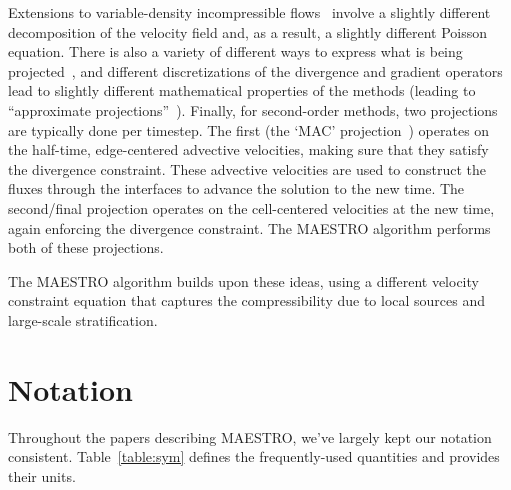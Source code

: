 Extensions to variable-density incompressible
flows~\cite{bellMarcus:1992b} involve a slightly different
decomposition of the velocity field and, as a result, a slightly
different Poisson equation.  There is also a variety of different ways
to express what is being projected~\cite{almgren:bell:crutchfield},
and different discretizations of the divergence and gradient operators
lead to slightly different mathematical properties of the methods
(leading to ``approximate
projections''~\cite{almgrenBellSzymczak:1996}).  Finally, for
second-order methods, two projections are typically done per timestep.
The first (the `MAC' projection~\cite{bellColellaHowell:1991})
operates on the half-time, edge-centered advective velocities, making
sure that they satisfy the divergence constraint.  These advective
velocities are used to construct the fluxes through the interfaces to
advance the solution to the new time.  The second/final projection
operates on the cell-centered velocities at the new time, again
enforcing the divergence constraint.  The MAESTRO algorithm performs
both of these projections.

The MAESTRO algorithm builds upon these ideas, using a different
velocity constraint equation that captures the compressibility
due to local sources and large-scale stratification.



\section{Notation}

Throughout the papers describing MAESTRO, we've largely kept our
notation consistent.  Table~\ref{table:sym} defines the
frequently-used quantities and provides their units.




